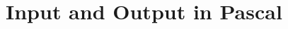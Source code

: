 \cleardoublepage
\def\pageLang{pas}

\section{Input and Output in Pascal} %
\label{sec:file_io_in_c}





